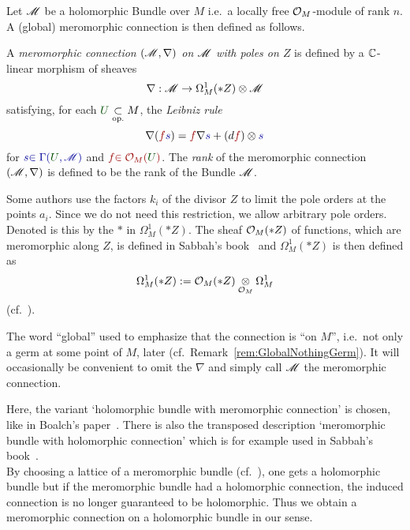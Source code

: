 Let $\mathscr{M}$ be a holomorphic Bundle over $M$ i.e.\ a locally free $\mathcal{O}_M$-module
of rank $n$.
A (global) meromorphic connection is then defined as follows.
\begin{defn}\label{defn:mercon}
  \def\myU{\textcolor{green!30!black}{U}}
  \def\mys{\textcolor{blue!60!black}{s}}
  \def\myf{\textcolor{red!60!black}{f}}
  A \emph{meromorphic connection $(\mathscr{M},\nabla)$ on $\mathscr{M}$ with poles on $Z$}
  is defined by a $\mathbb{C}$-linear morphism of sheaves
  \[
    \nabla:\mathscr{M}\to\Omega_M^1(*Z)\otimes\mathscr{M}
  \]
  satisfying, for each $\myU\underset{\text{op.}}{\subset} M$, the
  \emph{Leibniz rule}
    \[
      \nabla(\myf\mys)=\myf\nabla\mys+(d\myf)\otimes\mys
    \]
  for $\mys\textcolor{blue!60!black}{\in\Gamma(\myU,\sM)}$ and
  $\myf\textcolor{red!60!black}{\in\cO_M(\myU)}$.
  The \emph{rank} of the meromorphic connection $(\mathscr{M},\nabla)$ is defined to be
  the rank of the Bundle $\mathscr{M}$.
  \begin{s-rem}
    Some authors use the factors $k_i$ of the divisor $Z$ to limit the pole
    orders at the points $a_i$. Since we do not need this restriction, we allow
    arbitrary pole orders. Denoted is this by the $*$ in $\Omega_M^1(*Z)$.
    The sheaf $\mathcal{O}_M(*Z)$ of functions, which are meromorphic along $Z$, is
    defined in Sabbah's book~\cite[Sec.0.8]{sabbah2007isomonodromic} and
    $\Omega_M^1(*Z)$ is then defined as
    \[
      \Omega_M^1(*Z):=\mathcal{O}_M(*Z)\underset{\mathcal{O}_M}\otimes\Omega_M^1
    \]
     (cf.\
    \cite[Sec.0.9.b]{sabbah2007isomonodromic}).
  \end{s-rem}
\end{defn}
The word ``global'' used to emphasize that the connection is ``on $M$'', i.e.\
not only a germ at some point of $M$,  later
(cf.\ Remark~\ref{rem:GlobalNothingGerm}).
It will occasionally be convenient to omit the $\nabla$ and simply call $\mathscr{M}$
the meromorphic connection.
\begin{rem}
  Here, the variant `holomorphic bundle with meromorphic connection' is chosen,
  like in Boalch's paper~\cite{boalch}. There is also the transposed description
  `meromorphic bundle with holomorphic connection' which is for example used in
  Sabbah's book~\cite{sabbah2007isomonodromic}.
  \\By choosing a lattice of a meromorphic bundle
  (cf.\ \cite[Def.0.8.3]{sabbah2007isomonodromic}), one gets a holomorphic bundle
  but if the meromorphic bundle had a holomorphic connection, the induced
  connection \rewrite{on the lattice} is no longer guaranteed to be holomorphic.
  Thus we obtain a meromorphic connection on a holomorphic bundle in our sense.
\end{rem}

